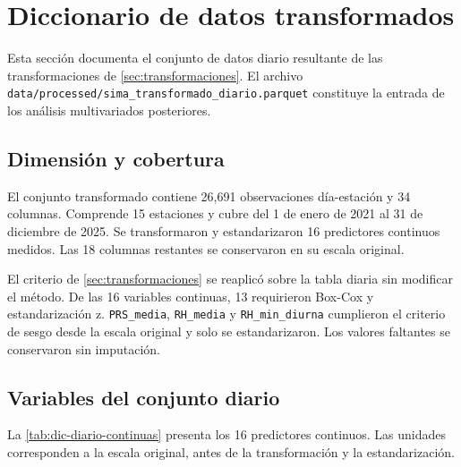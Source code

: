 \section{Diccionario de datos transformados}\label{sec:diccionario-transformado}
Esta sección documenta el conjunto de datos diario resultante de las
transformaciones de \cref{sec:transformaciones}. El archivo
\texttt{data/processed/sima\_transformado\_diario.parquet} constituye la entrada
de los análisis multivariados posteriores.

\subsection{Dimensión y cobertura}
El conjunto transformado contiene 26,691 observaciones día-estación y 34
columnas. Comprende 15 estaciones y cubre del 1 de enero de 2021 al 31 de diciembre
de 2025. Se transformaron y estandarizaron 16 predictores continuos medidos. Las
18 columnas restantes se conservaron en su escala original.

El criterio de \cref{sec:transformaciones} se reaplicó sobre la tabla diaria sin
modificar el método. De las 16 variables continuas, 13 requirieron Box-Cox y
estandarización z. \texttt{PRS\_media}, \texttt{RH\_media} y
\texttt{RH\_min\_diurna} cumplieron el criterio de sesgo desde la escala
original y solo se estandarizaron. Los valores faltantes se conservaron sin
imputación.

\subsection{Variables del conjunto diario}
La \cref{tab:dic-diario-continuas} presenta los 16 predictores continuos. Las
unidades corresponden a la escala original, antes de la transformación y la
estandarización.

